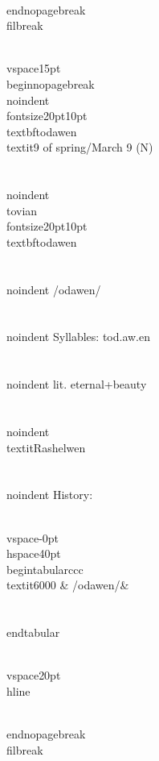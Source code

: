 \\end{nopagebreak}
\\filbreak



\\vspace{15pt}
\\begin{nopagebreak}
\\noindent{\\fontsize{20pt}{10pt}\\textbf{todawen} } \\textit{9 of spring/March 9} (N)\\\\
\\noindent {\\tovian \\fontsize{20pt}{10pt} \\textbf{todawen} }\\\\
\\noindent /{}od{\textprimstress}awen/\\\\
\\noindent Syllables: tod.aw.en\\\\
\\noindent lit. eternal+beauty\\\\
\\noindent \\textit{Rashelwen}\\\\


\\noindent History:

\\vspace{-0pt}
\\hspace{40pt}
\\begin{tabular}{ccc}
\\textit{6000} & /{}odawen/& \\\\
\\end{tabular}

\\vspace{20pt}\\hline

\\end{nopagebreak}
\\filbreak



